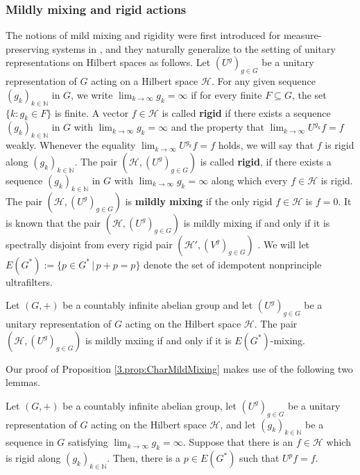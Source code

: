 \documentclass[graybox]{svmult}
\theoremstyle{definition}
\newcommand{\N}{\mathbb{N}}
\begin{document}
\subsubsection{Mildly mixing and rigid actions}\label{sssec:MildMixingRigid}
The notions of  mild mixing and rigidity were first introduced for measure-preserving systems in \cite{Walters1972,TheBirthOfMildMixing}, and they naturally generalize to the setting of unitary representations on Hilbert spaces as follows.
Let $(U^g)_{g\in G}$ be a unitary representation of $G$ acting on a Hilbert space $\mathcal H$. 
For any given sequence $(g_k)_{k\in\N}$ in $G$, we write $\lim_{k\rightarrow\infty}g_k=\infty$ if for every finite $F\subseteq G$, the set $\{k:g_k\in F\}$ is finite.
A vector $f\in\mathcal H$ is called \textbf{rigid} if there exists a sequence $(g_k)_{k\in\N}$ in $G$ with $\lim_{k\rightarrow\infty}g_k=\infty$ and the property that $\lim_{k\rightarrow\infty}U^{g_k}f=f$ weakly. 
Whenever the equality  $\lim_{k\rightarrow\infty}U^{g_k}f=f$ holds, we will say that $f$ is rigid along $(g_k)_{k\in\N}$.
The pair $(\mathcal H, (U^g)_{g\in G})$ is called \textbf{rigid}, if there exists a sequence $(g_k)_{k\in\N}$ in $G$ with $\lim_{k\rightarrow\infty} g_k=\infty$ along which every $f\in\mathcal H$ is rigid.
The pair $(\mathcal H,(U^g)_{g\in G})$ is \textbf{mildly mixing} if the only rigid $f\in \mathcal H$ is $f=0$.
It is known that the pair $(\mathcal H,(U^g)_{g\in G})$ is mildly mixing if and only if it is spectrally disjoint from every rigid pair $(\mathcal H',(V^g)_{g\in G})$ \cite[Theorem 0.4]{PolynomialActionsOfUnitaryOperators}.
We will let $E(G^*):=\{p\in G^*\,|\,p+p=p\}$ denote the set of idempotent nonprinciple ultrafilters. 
\begin{proposition}\label{3.prop:CharMildMixing}
    Let $(G,+)$ be a countably infinite abelian group and let $(U^g)_{g\in G}$ be a unitary representation of $G$ acting on the Hilbert space $\mathcal H$. The pair $(\mathcal H,(U^g)_{g\in G})$ is mildly mxiing if and only if it is $E(G^*)$-mixing.  
\end{proposition}
Our proof of Proposition \ref{3.prop:CharMildMixing} makes use of the following two lemmas.
\begin{lemma}\label{3.lem:SortOfEllisLemma}
 Let $(G,+)$ be a countably infinite abelian group, let $(U^g)_{g\in G}$ be a unitary representation of $G$ acting on the Hilbert space $\mathcal H$, and let $(g_k)_{k\in\N}$ be a sequence in $G$ satisfying $\lim_{k\rightarrow\infty}g_k=\infty$. 
    Suppose that there is an $f\in\mathcal H$ which is rigid along $(g_k)_{k\in\N}$.
    Then, there is a $p\in E(G^*)$ such that $U^pf=f$.
\end{lemma}
\end{document}
